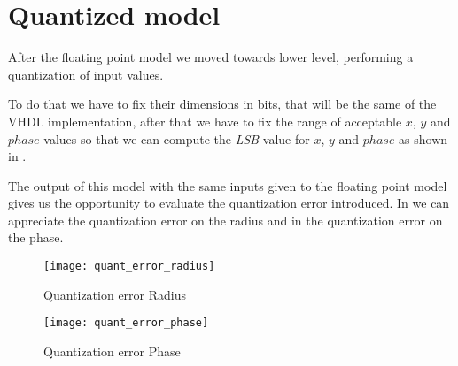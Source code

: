 \section{Quantized model}\label{sec:quantized}

After the floating point model we moved towards lower level, performing a
quantization of input values.

To do that we have to fix their dimensions in bits, that will be the same of the
VHDL implementation, after that we have to fix the range of acceptable \(x\),
\(y\) and \(phase\) values so that we can compute the \emph{LSB} value for
\(x\), \(y\) and \(phase\) as shown in .



The output of this model with the same inputs given to the floating point model
gives us the opportunity to evaluate the quantization error introduced. In
 we can appreciate the quantization error on the radius
and in  the quantization error on the phase.


\begin{figure}[htb]
	\texttt{[image: quant\_error\_radius]}
	\caption{Quantization error Radius}\label{fig:qerrorradius}
\end{figure}
\begin{figure}[htb]
	\texttt{[image: quant\_error\_phase]}
	\caption{Quantization error Phase}\label{fig:qerrorphase}
\end{figure}
